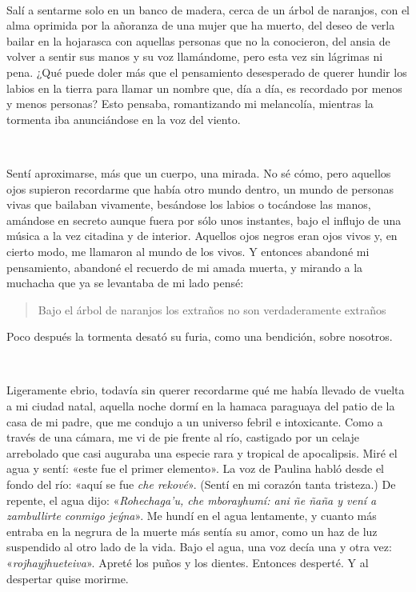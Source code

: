 \documentclass[a4paper, 12pt]{article}
\begin{document}
~

Salí a sentarme solo en un banco de madera, cerca de un árbol de naranjos, con
el alma oprimida por la añoranza de una mujer que ha muerto, del deseo de verla
bailar en la hojarasca con aquellas personas que no la conocieron, del ansia de
volver a sentir sus manos y su voz llamándome, pero esta vez sin lágrimas ni
pena. ¿Qué puede doler más que el pensamiento desesperado de querer hundir los
labios en la tierra para llamar un nombre que, día a día, es recordado por menos
y menos personas? Esto pensaba, romantizando mi melancolía, mientras la tormenta
iba anunciándose en la voz del viento.

~

Sentí aproximarse, más que un cuerpo, una mirada. No sé cómo, pero aquellos ojos
supieron recordarme que había otro mundo dentro, un mundo de personas vivas que
bailaban vivamente, besándose los labios o tocándose las manos, amándose en
secreto aunque fuera por sólo unos instantes, bajo el influjo de una música a la
vez citadina y de interior. Aquellos ojos negros eran ojos vivos y, en cierto
modo, me llamaron al mundo de los vivos. Y entonces abandoné mi pensamiento,
abandoné el recuerdo de mi amada muerta, y mirando a la muchacha que ya se
levantaba de mi lado pensé:

\begin{quote}
Bajo el árbol de naranjos\newline
los extraños no son\newline
verdaderamente extraños
\end{quote}

Poco después la tormenta desató su furia, como una bendición, sobre nosotros.

~ 

Ligeramente ebrio, todavía sin querer recordarme qué me había llevado de vuelta
a mi ciudad natal, aquella noche dormí en la hamaca paraguaya del patio de la
casa de mi padre, que me condujo a un universo febril e intoxicante. Como a
través de una cámara, me vi de pie frente al río, castigado por un celaje
arrebolado que casi auguraba una especie rara y tropical de apocalipsis. Miré el
agua y sentí: «este fue el primer elemento». La voz de Paulina habló desde el
fondo del río: «aquí se fue \textit{che rekové}». (Sentí en mi corazón tanta
tristeza.) De repente, el agua dijo: «\textit{Rohechaga'u, che mborayhumí: ani
ñe ñaña y vení a zambullirte conmigo jeýna}». Me hundí en el agua lentamente, y
cuanto más entraba en la negrura de la muerte más sentía su amor, como un haz de
luz suspendido al otro lado de la vida. Bajo el agua, una voz decía una y otra
vez: «\textit{rojhayjhueteiva}». Apreté los puños y los dientes. Entonces
desperté. Y al despertar quise morirme.
\end{document}
